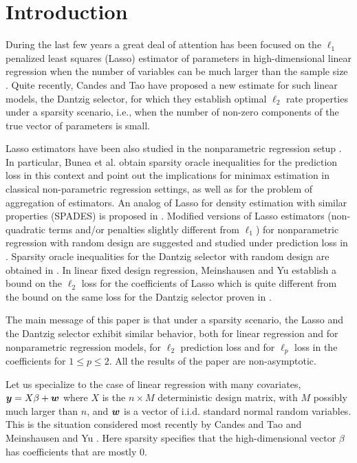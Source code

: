 \documentclass[dvips,aos]{imsart}
\numberwithin{equation}{section}
\theoremstyle{plain}
\newcommand{\bb}{\mbox{\boldmath$\beta$}}
\def\bb{\beta}
\newcommand{\bmy}{\mbox{\boldmath$y$}}
\newcommand{\bmw}{\mbox{\boldmath$w$}}
\begin{document}
\def\citenumfont{}

\section{Introduction}\label{sec0}





During the last few years a great deal of attention has been focused
on the $\ell_1$ penalized least squares (Lasso) estimator of
parameters in high-dimensional linear regression when the number of
variables can be much larger than the sample size
\cite{det04,ehjt04,kf00,mb06,my06,os00a,os00b,t96,zh06,zy05}. Quite
recently, Candes and Tao \cite{ct07} have proposed a new estimate
for such linear models, the Dantzig selector, for which they
establish optimal $\ell_2$ rate properties under a sparsity
scenario, i.e., when the number of non-zero components of the true
vector of parameters is small.

 Lasso estimators have been
also studied in the nonparametric regression setup
\cite{jn00,n00,gr04,btw04,btw06a,btw07,btw06b}. In particular, Bunea
et al. \cite{btw04,btw06a,btw07,btw06b} obtain sparsity oracle
inequalities for the prediction loss in this context and point out
the implications for minimax estimation in classical non-parametric
regression settings, as well as for the problem of aggregation of
estimators. An analog of Lasso for density estimation with similar
properties (SPADES) is proposed in \cite{btw07a}. Modified versions
of Lasso estimators  (non-quadratic   terms and/or
penalties slightly different from $\ell_1$) for nonparametric
regression with random design are suggested and studied under
prediction loss in \cite{k06,vdg06}. Sparsity oracle inequalities
for the Dantzig selector with random design are obtained in \cite{k07}.
In linear fixed design regression, Meinshausen and Yu \cite{my06}
establish a bound on the $\ell_2$ loss for the coefficients of Lasso
which is quite different from the bound on the same loss for the Dantzig selector proven in
\cite{ct07}.

The main message of this paper is that under a sparsity scenario,
the Lasso and the Dantzig selector exhibit similar behavior, both
for linear regression and for nonparametric regression models, for
$\ell_2$ prediction loss and for $\ell_p$ loss in the coefficients
for $1\le p\le 2$. All the results of the paper are non-asymptotic.

Let us specialize to the case of linear regression with many
covariates, $\bmy=X\bb+\bmw$ where $X$ is the $n\times M$
deterministic design matrix, with $M$ possibly much larger than $n$,
and $\bmw$ is a vector of i.i.d. standard normal random variables.
This is the situation considered most recently by Candes and Tao
\cite{ct07} and Meinshausen and Yu \cite{my06}.  Here sparsity
specifies that the high-dimensional vector $\bb$ has coefficients
that are mostly 0.
\end{document}
